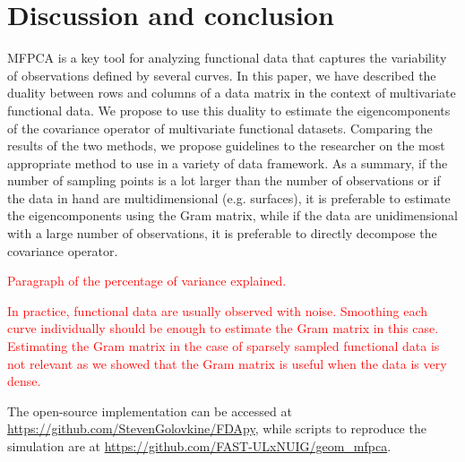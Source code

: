 \section{Discussion and conclusion} %
\label{sec:discussion}

MFPCA is a key tool for analyzing functional data that captures the variability of observations defined by several curves. In this paper, we have described the duality between rows and columns of a data matrix in the context of multivariate functional data. We propose to use this duality to estimate the eigencomponents of the covariance operator of multivariate functional datasets. Comparing the results of the two methods, we propose guidelines to the researcher on the most appropriate method to use in a variety of data framework. As a summary, if the number of sampling points is a lot larger than the number of observations or if the data in hand are multidimensional (e.g. surfaces), it is preferable to estimate the eigencomponents using the Gram matrix, while if the data are unidimensional with a large number of observations, it is preferable to directly decompose the covariance operator.

\textcolor{red}{Paragraph of the percentage of variance explained.}

\textcolor{red}{In practice, functional data are usually observed with noise. Smoothing each curve individually should be enough to estimate the Gram matrix in this case. Estimating the Gram matrix in the case of sparsely sampled functional data is not relevant as we showed that the Gram matrix is useful when the data is very dense.}

The open-source implementation can be accessed at \url{https://github.com/StevenGolovkine/FDApy}, while scripts to reproduce the simulation are at \url{https://github.com/FAST-ULxNUIG/geom_mfpca}.


